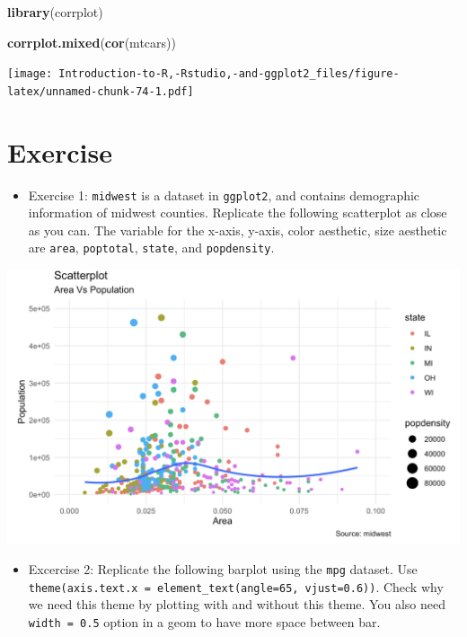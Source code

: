 \documentclass[]{book}
\newenvironment{Shaded}{\begin{snugshade}}{\end{snugshade}}
\newcommand{\KeywordTok}[1]{\textcolor[rgb]{0.13,0.29,0.53}{\textbf{#1}}}
\newcommand{\NormalTok}[1]{#1}
\providecommand{\tightlist}{%
  \setlength{\itemsep}{0pt}\setlength{\parskip}{0pt}}
\begin{document}
\begin{Shaded}
\begin{Highlighting}[]
\KeywordTok{library}\NormalTok{(corrplot)}
\end{Highlighting}
\end{Shaded}

\begin{Shaded}
\begin{Highlighting}[]
\KeywordTok{corrplot.mixed}\NormalTok{(}\KeywordTok{cor}\NormalTok{(mtcars))}
\end{Highlighting}
\end{Shaded}

\texttt{[image: Introduction-to-R,-Rstudio,-and-ggplot2\_files/figure-latex/unnamed-chunk-74-1.pdf]}

\hypertarget{exercise}{%
\chapter{Exercise}\label{exercise}}

\begin{itemize}
\tightlist
\item
  Exercise 1: \texttt{midwest} is a dataset in \texttt{ggplot2}, and contains demographic information of midwest counties. Replicate the following scatterplot as close as you can. The variable for the x-axis, y-axis, color aesthetic, size aesthetic are \texttt{area}, \texttt{poptotal}, \texttt{state}, and \texttt{popdensity}.
\end{itemize}

\includegraphics{practice1.png}

\begin{itemize}
\tightlist
\item
  Excercise 2: Replicate the following barplot using the \texttt{mpg} dataset. Use \texttt{theme(axis.text.x\ =\ element\_text(angle=65,\ vjust=0.6))}. Check why we need this theme by plotting with and without this theme. You also need \texttt{width\ =\ 0.5} option in a geom to have more space between bar.
\end{itemize}
\end{document}
